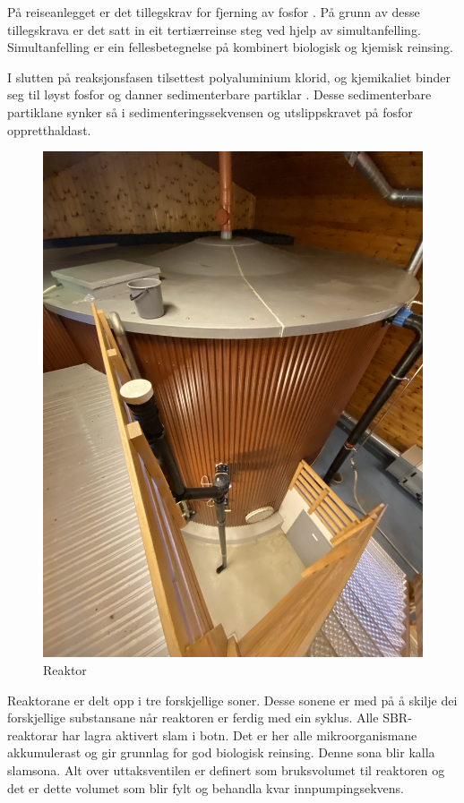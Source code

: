 På reiseanlegget er det tillegskrav for fjerning av fosfor \citep{Regjeriga}. På grunn av desse tillegskrava
er det satt in eit tertiærreinse steg ved hjelp av simultanfelling.
Simultanfelling er ein fellesbetegnelse på kombinert biologisk og kjemisk reinsing.

I slutten på reaksjonsfasen tilsettest polyaluminium klorid, og kjemikaliet binder seg til
løyst fosfor og danner sedimenterbare partiklar \citep{Pax18}. Desse sedimenterbare partiklane synker 
så i sedimenteringssekvensen og utslippskravet på fosfor oppretthaldast.

\begin{figure}[htbp]
    \centering
    \includegraphics[angle=-90, width=1\textwidth]{Bilder/BildeReaktor.jpg}
    \caption{Reaktor}\label{fig:reaktorsoner}
\end{figure}

\newpage

Reaktorane er delt opp i tre forskjellige soner. Desse sonene er med på å skilje
dei forskjellige substansane når reaktoren er ferdig med ein syklus.
Alle \gls{SBR}-reaktorar har lagra aktivert slam i botn. Det er her alle mikroorganismane akkumulerast
og gir grunnlag for god biologisk reinsing. Denne sona blir kalla slamsona.\newline
Alt over uttaksventilen er definert som bruksvolumet til reaktoren og det
er dette volumet som blir fylt og behandla kvar innpumpingsekvens.

